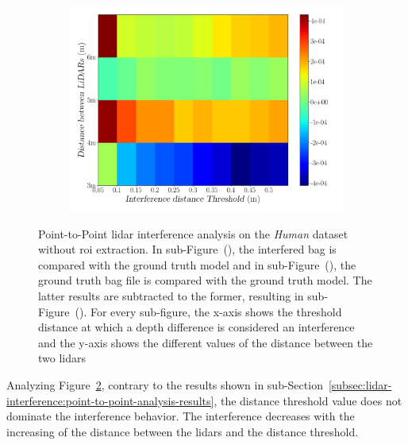 \begin{figure}[!ht]
	\begin{subfigure}[c]{0.6\textwidth}
		\centering
		\includegraphics[width=\textwidth]{img/lidar-interference/human/difference_ground_truth_interference_measurement.png}
		\caption{}
		\label{fig:human:difference-color-mesh}
	\end{subfigure}

	\caption[Point-to-Point analysis of the interference on the \textit{Human} dataset without \acs{roi} extraction. Results are presented for the ground-truth bag, interference bag and the subtraction of the results between the two.]{Point-to-Point \ac{lidar} interference analysis on the \textit{Human} dataset without \ac{roi} extraction. In sub-Figure~(), the interfered bag is compared with the ground truth model and in sub-Figure~(), the ground truth bag file is compared with the ground truth model. The latter results are subtracted to the former, resulting in sub-Figure~(). For every sub-figure, the x-axis shows the threshold distance at which a depth difference is considered an interference and the y-axis shows the different values of the distance between the two \acp{lidar}} 
	\label{fig:human:color-mesh}
\end{figure}

Analyzing Figure~\ref{fig:human:color-mesh}, contrary to the results shown in sub-Section~\ref{subsec:lidar-interference:point-to-point-analysis-results}, the distance threshold value does not dominate the interference behavior. The interference decreases with the increasing of the distance between the \acp{lidar} and the distance threshold.

